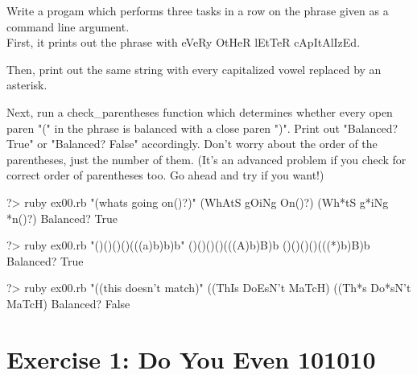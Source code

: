 \documentclass{42-en}
\begin{document}
Write a progam which performs three tasks in a row on the phrase given as a command line argument.\\

First, it prints out the phrase with eVeRy OtHeR lEtTeR cApItAlIzEd.

Then, print out the same string with every capitalized vowel replaced by an asterisk.

Next, run a check\_parentheses function which determines whether every open paren "(" in the phrase is balanced with a close paren ")". Print out "Balanced? True" or "Balanced? False" accordingly. Don't worry about the order of the parentheses, just the number of them. (It's an advanced problem if you check for correct order of parentheses too. Go ahead and try if you want!)\\

\begin{42console}
	?> ruby ex00.rb "(whats going on()?)"
	(WhAtS gOiNg On()?)
	(Wh*tS g*iNg *n()?)
	Balanced? True
\end{42console}

\begin{42console}
	?> ruby ex00.rb "()()()()(((a)b)b)b"
	()()()()(((A)b)B)b
	()()()()(((*)b)B)b
	Balanced? True
\end{42console}

\begin{42console}
	?> ruby ex00.rb "((this doesn't match)"
	((ThIs DoEsN't MaTcH)
	((Th*s Do*sN't MaTcH)
	Balanced? False
\end{42console}




\chapter{Exercise 1: Do You Even 101010}


\makeheaderfiles
\end{document}
